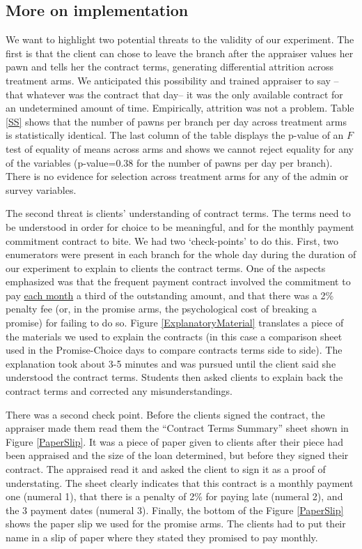 \documentclass[oneside,11pt]{article}
\begin{document}
\subsection{More on implementation} \label{implementation}

We want to highlight two potential threats to the validity of our experiment. The first is that the client can chose to leave the branch after the appraiser values her pawn and tells her the contract terms, generating differential attrition across treatment arms. We anticipated this possibility and trained appraiser to say --that whatever was the contract that day-- it was the only available contract for an undetermined amount of time. Empirically, attrition was not a problem. Table \ref{SS} shows that the number of pawns per branch per day across treatment arms is statistically identical. The last column of the table displays the p-value of an $F$ test of equality of means across arms and shows we cannot reject equality for any of the variables (p-value=0.38 for the number of pawns per day per branch). There is no evidence for selection across treatment arms for any of the admin or survey variables.

The second threat is clients' understanding of contract terms. The terms need to be understood in order for choice to be meaningful, and for the monthly payment commitment contract to bite. We had two `check-points' to do this. First, two enumerators were present in each branch for the whole day during the duration of our experiment to explain to clients the contract terms. One of the aspects emphasized was that the frequent payment contract involved the commitment to pay \underline{each month} a third of the outstanding amount, and that there was a 2\% penalty fee (or, in the promise arms, the psychological cost of breaking a promise) for failing to do so.  Figure \ref{ExplanatoryMaterial} translates a piece of the materials we used to explain the contracts (in this case a comparison sheet used in the Promise-Choice days to compare contracts terms side to side). The explanation took about 3-5 minutes and was pursued until the client said she understood the contract terms. Students then asked clients to explain back the contract terms and corrected any misunderstandings. 

There was a second check point. Before the clients signed the contract, the appraiser made them read them the ``Contract Terms Summary'' sheet shown in Figure \ref{PaperSlip}. It was a piece of paper given to clients after their piece had been appraised and the size of the loan determined, but before they signed their contract. The appraised read it and asked the client to sign it as a proof of understating. The sheet clearly indicates that this contract is a monthly payment one (numeral 1), that there is a penalty of 2\% for paying late (numeral 2), and the 3 payment dates (numeral 3). Finally, the bottom of the Figure \ref{PaperSlip} shows the paper slip we used for the promise arms. The clients had to put their name in a slip of paper where they stated they promised to pay monthly.
\end{document}
